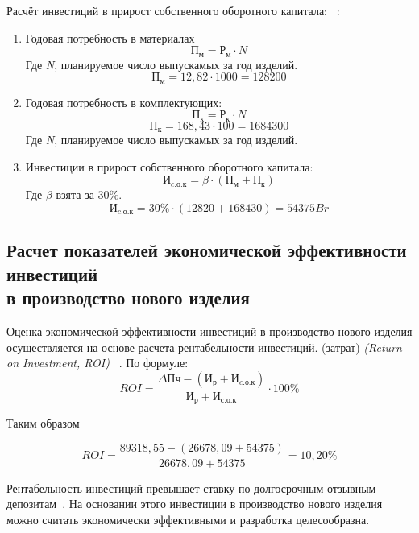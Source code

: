 Расчёт инвестиций в прирост собственного оборотного капитала:
~\cite{bsuir-project-economics}:
\begin{enumerate}
\item Годовая потребность в материалах
  \begin{equation}
    П_м = Р_м \cdot N
  \end{equation}
Где \textit{N}, планируемое число выпускамых за год изделий.
  $$  П_м = 12,82 \cdot 1000 = 128200$$
\item Годовая потребность в комплектующих:
  \begin{equation}
    П_к = Р_к \cdot N
  \end{equation}
  $$П_к = 168,43 \cdot 100 = 1684300$$
Где \textit{N}, планируемое число выпускамых за год изделий.

\item Инвестиции в прирост собственного оборотного капитала:
\begin{equation}
  И_{c.о.к} = \beta \cdot (П_м + П_к)
\end{equation}
Где $\beta$ взята за 30\%.
$$   И_{c.о.к} = 30\% \cdot (12820 + 168430) = 54375Br$$
\end{enumerate}

\subsection{Расчет показателей экономической эффективности инвестиций \\
  в производство нового изделия}
 Оценка экономической эффективности инвестиций в производство нового
изделия осуществляется на основе расчета рентабельности инвестиций.
(затрат) \textit{(Return on Investment, ROI)} ~\cite{bsuir-project-economics}.
По формуле:
\begin{equation}
  ROI= \frac{\Delta Пч - (И_р + И_{c.о.к})}{И_р + И_{с.о.к}} \cdot 100 \%
\end{equation}

Таким образом

$$ROI=\frac{89 318,55 - (26678,09 + 54375)}{26678,09 + 54375}= 10,20\%$$

Рентабельность инвестиций превышает ставку по долгосрочным отзывным
депозитам~\cite{belarusbank-vklady}.
На основании этого инвестиции в производство нового изделия можно
считать экономически эффективными и разработка целесообразна.

\newpage

